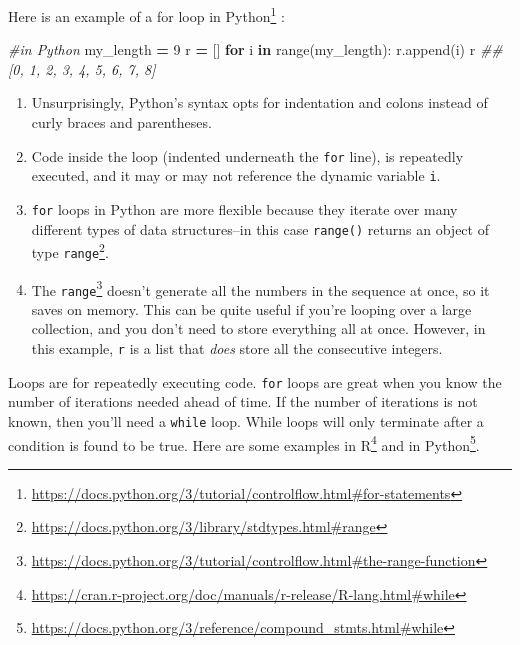 \documentclass[
  12pt,
  krantz2]{krantz}
\makeatletter
\newenvironment{Shaded}{\begin{snugshade}}{\end{snugshade}}
\newcommand{\BuiltInTok}[1]{#1}
\newcommand{\CommentTok}[1]{\textcolor[rgb]{0.37,0.37,0.37}{\textit{#1}}}
\newcommand{\ControlFlowTok}[1]{\textcolor[rgb]{0.27,0.27,0.27}{\textbf{#1}}}
\newcommand{\DecValTok}[1]{\textcolor[rgb]{0.06,0.06,0.06}{#1}}
\newcommand{\KeywordTok}[1]{\textcolor[rgb]{0.27,0.27,0.27}{\textbf{#1}}}
\newcommand{\NormalTok}[1]{#1}
\newcommand{\OperatorTok}[1]{\textcolor[rgb]{0.43,0.43,0.43}{\textbf{#1}}}
\providecommand{\tightlist}{%
  \setlength{\itemsep}{0pt}\setlength{\parskip}{0pt}}
\renewcommand{\href}[2]{#2\footnote{\url{#1}}}
\newenvironment{kframe}{%
\medskip{}
\setlength{\fboxsep}{.8em}
 \def\at@end@of@kframe{}%
 \ifinner\ifhmode%
  \def\at@end@of@kframe{\end{minipage}}%
  \begin{minipage}{\columnwidth}%
 \fi\fi%
 \def\FrameCommand##1{\hskip\@totalleftmargin \hskip-\fboxsep
 \colorbox{shadecolor}{##1}\hskip-\fboxsep
     \hskip-\linewidth \hskip-\@totalleftmargin \hskip\columnwidth}%
 \MakeFramed {\advance\hsize-\width
   \@totalleftmargin\z@ \linewidth\hsize
   \@setminipage}}%
 {\par\unskip\endMakeFramed%
 \at@end@of@kframe}
\renewenvironment{Shaded}{\begin{kframe}}{\end{kframe}}
\makeatother
\begin{document}
\href{https://docs.python.org/3/tutorial/controlflow.html\#for-statements}{Here is an example of a for loop in Python} \citep{Lutz13}:

\begin{Shaded}
\begin{Highlighting}[]
\CommentTok{\#in Python}
\NormalTok{my\_length }\OperatorTok{=} \DecValTok{9}
\NormalTok{r }\OperatorTok{=}\NormalTok{ []}
\ControlFlowTok{for}\NormalTok{ i }\KeywordTok{in} \BuiltInTok{range}\NormalTok{(my\_length):}
\NormalTok{  r.append(i)}
\NormalTok{r}
\CommentTok{\#\# [0, 1, 2, 3, 4, 5, 6, 7, 8]}
\end{Highlighting}
\end{Shaded}

\begin{enumerate}
\def\labelenumi{\arabic{enumi}.}
\tightlist
\item
  Unsurprisingly, Python's syntax opts for indentation and colons instead of curly braces and parentheses.
\item
  Code inside the loop (indented underneath the \texttt{for} line), is repeatedly executed, and it may or may not reference the dynamic variable \texttt{i}.
\item
  \texttt{for} loops in Python are more flexible because they iterate over many different types of data structures--in this case \href{https://docs.python.org/3/library/stdtypes.html\#range}{\texttt{range()} returns an object of type \texttt{range}}.
\item
  The \href{https://docs.python.org/3/tutorial/controlflow.html\#the-range-function}{\texttt{range}} doesn't generate all the numbers in the sequence at once, so it saves on memory. This can be quite useful if you're looping over a large collection, and you don't need to store everything all at once. However, in this example, \texttt{r} is a list that \emph{does} store all the consecutive integers.
\end{enumerate}

Loops are for repeatedly executing code. \texttt{for} loops are great when you know the number of iterations needed ahead of time. If the number of iterations is not known, then you'll need a \texttt{while} loop. While loops will only terminate after a condition is found to be true. Here are some examples \href{https://cran.r-project.org/doc/manuals/r-release/R-lang.html\#while}{in R} and \href{https://docs.python.org/3/reference/compound_stmts.html\#while}{in Python}.
\end{document}

